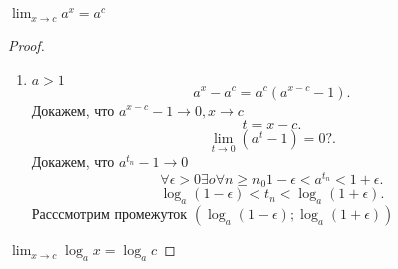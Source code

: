 \documentclass[a4paper]{article}
\begin{document}
\subsection{}
$\lim_{x \to c} a^x = a^c$
\begin{proof}
   \begin{enumerate}
       \item $a>1$
           \[
               a^x - a^c = a^c(a^{x - c} - 1)
           .\] 
           Докажем, что $a^{x - c} - 1 \to 0, x \to c$
            \[
           t = x - c
           .\] 
           \[
           \lim_{t \to 0} (a^t - 1) = 0 ?
           .\] 
           Докажем, что $a^{t_n} - 1 \to 0$
           \[
               \forall \epsilon > 0 \exists o \forall n \ge n_0 1 - \epsilon < a^{t_n} < 1 + \epsilon
           .\] 
           \[
               \log_a{( 1 - \epsilon )} < t_n < \log_a{( 1 + \epsilon )}
           .\] 
           Расссмотрим промежуток $(\log_a{( 1 - \epsilon )};\log_a{( 1 + \epsilon )})$
   \end{enumerate} 
   \item
       $\lim_{x \to c} \log_a{x} = \log_a{c}$
\end{proof}
\end{document}
